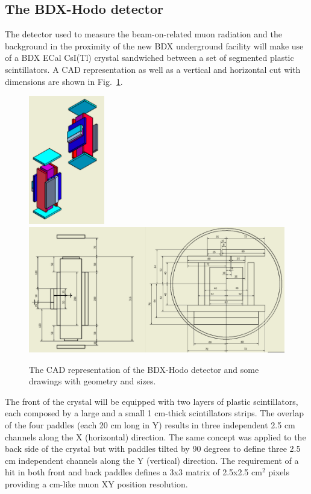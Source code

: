 \subsection{The BDX-Hodo detector}
The detector used to measure the beam-on-related muon radiation and the background in the proximity of the new BDX underground facility will  make use of a BDX ECal CsI(Tl) crystal sandwiched between a set of segmented plastic scintillators.
A CAD representation as well as  a vertical and horizontal  cut with dimensions are shown in Fig.~\ref{fig:det-cad}.
\begin{figure}[h!] 
\center
\includegraphics[width=3.3cm]{figs/det-3d1.pdf}  
\includegraphics[width=11.5cm]{figs/det-3d2.pdf}   
\caption{The CAD representation of the BDX-Hodo detector and some drawings with geometry and sizes.}
\label{fig:det-cad}
\end{figure}
The front of the crystal will be equipped with two  layers of plastic scintillators, each composed by  a large and a small 1 cm-thick scintillators strips. The overlap of the four paddles (each 20 cm long in Y)  results in three independent  2.5 cm channels along the X (horizontal) direction.
The same concept was applied to the  back side of the crystal but with paddles tilted by 90 degrees to define three 2.5 cm independent channels along the Y (vertical) direction. The requirement of a hit in both front and back paddles defines a 3x3 matrix of 2.5x2.5 cm$^2$ pixels providing a cm-like muon XY position resolution. 
